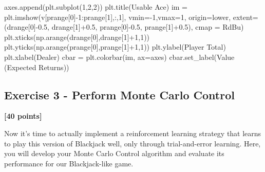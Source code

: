 \documentclass[
  letterpaper,
  DIV=11,
  numbers=noendperiod]{scrartcl}
\newenvironment{Shaded}{\begin{snugshade}}{\end{snugshade}}
\newcommand{\DecValTok}[1]{\textcolor[rgb]{0.68,0.00,0.00}{#1}}
\newcommand{\FloatTok}[1]{\textcolor[rgb]{0.68,0.00,0.00}{#1}}
\newcommand{\NormalTok}[1]{\textcolor[rgb]{0.00,0.23,0.31}{#1}}
\newcommand{\OperatorTok}[1]{\textcolor[rgb]{0.37,0.37,0.37}{#1}}
\newcommand{\StringTok}[1]{\textcolor[rgb]{0.13,0.47,0.30}{#1}}
\begin{document}
\begin{Shaded}
\begin{Highlighting}[]
\NormalTok{    axes.append(plt.subplot(}\DecValTok{1}\NormalTok{,}\DecValTok{2}\NormalTok{,}\DecValTok{2}\NormalTok{))}
\NormalTok{    plt.title(}\StringTok{\textquotesingle{}Usable Ace\textquotesingle{}}\NormalTok{)}
\NormalTok{    im }\OperatorTok{=}\NormalTok{ plt.imshow(v[prange[}\DecValTok{0}\NormalTok{]}\OperatorTok{{-}}\DecValTok{1}\NormalTok{:prange[}\DecValTok{1}\NormalTok{],:,}\DecValTok{1}\NormalTok{], }
\NormalTok{               vmin}\OperatorTok{={-}}\DecValTok{1}\NormalTok{,vmax}\OperatorTok{=}\DecValTok{1}\NormalTok{,}
\NormalTok{               origin}\OperatorTok{=}\StringTok{\textquotesingle{}lower\textquotesingle{}}\NormalTok{, }
\NormalTok{               extent}\OperatorTok{=}\NormalTok{(drange[}\DecValTok{0}\NormalTok{]}\OperatorTok{{-}}\FloatTok{0.5}\NormalTok{,}
\NormalTok{                       drange[}\DecValTok{1}\NormalTok{]}\OperatorTok{+}\FloatTok{0.5}\NormalTok{,}
\NormalTok{                       prange[}\DecValTok{0}\NormalTok{]}\OperatorTok{{-}}\FloatTok{0.5}\NormalTok{,}
\NormalTok{                       prange[}\DecValTok{1}\NormalTok{]}\OperatorTok{+}\FloatTok{0.5}\NormalTok{),}
\NormalTok{               cmap }\OperatorTok{=} \StringTok{\textquotesingle{}RdBu\textquotesingle{}}\NormalTok{)}
\NormalTok{    plt.xticks(np.arange(drange[}\DecValTok{0}\NormalTok{],drange[}\DecValTok{1}\NormalTok{]}\OperatorTok{+}\DecValTok{1}\NormalTok{,}\DecValTok{1}\NormalTok{))}
\NormalTok{    plt.yticks(np.arange(prange[}\DecValTok{0}\NormalTok{],prange[}\DecValTok{1}\NormalTok{]}\OperatorTok{+}\DecValTok{1}\NormalTok{,}\DecValTok{1}\NormalTok{))}
\NormalTok{    plt.ylabel(}\StringTok{\textquotesingle{}Player Total\textquotesingle{}}\NormalTok{)}
\NormalTok{    plt.xlabel(}\StringTok{\textquotesingle{}Dealer\textquotesingle{}}\NormalTok{)}
\NormalTok{    cbar }\OperatorTok{=}\NormalTok{ plt.colorbar(im, ax}\OperatorTok{=}\NormalTok{axes)}
\NormalTok{    cbar.set\_label(}\StringTok{\textquotesingle{}Value (Expected Returns)\textquotesingle{}}\NormalTok{)}
\end{Highlighting}
\end{Shaded}

\subsection{Exercise 3 - Perform Monte Carlo
Control}\label{exercise-3---perform-monte-carlo-control}

\textbf{{[}40 points{]}}

Now it's time to actually implement a reinforcement learning strategy
that learns to play this version of Blackjack well, only through
trial-and-error learning. Here, you will develop your Monte Carlo
Control algorithm and evaluate its performance for our Blackjack-like
game.
\end{document}
